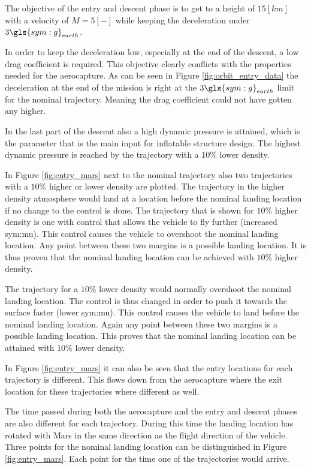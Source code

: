 The objective of the entry and descent phase is to get to a height of $15 \left[km\right]$ with a velocity of $M = 5\left[-\right]$ while keeping the deceleration under $3 \gls{sym:g}_{earth}$.

In order to keep the deceleration low, especially at the end of the descent, a low drag coefficient is required. This objective clearly conflicts with the properties needed for the aerocapture. As can be seen in Figure \ref{fig:orbit_entry_data} the deceleration at the end of the mission is right at the $3 \gls{sym:g}_{earth}$ limit for the nominal trajectory. Meaning the drag coefficient could not have gotten any higher.

In the last part of the descent also a high dynamic pressure is attained, which is the parameter that is the main input for inflatable structure design. The highest dynamic pressure is reached by the trajectory with a $10\%$ lower density.

In Figure \ref{fig:entry_mars} next to the nominal trajectory also two trajectories with a $10\%$ higher or lower density are plotted. The trajectory in the higher density atmosphere would land at a location before the nominal landing location if no change to the control is done. The trajectory that is shown for $10\%$ higher density is one with control that allows the vehicle to fly further (increased \gls{sym:mu}). This control causes the vehicle to overshoot the nominal landing location. Any point between these two margins is a possible landing location. It is thus proven that the nominal landing location can be achieved with $10\%$ higher density.

The trajectory for a $10\%$ lower density would normally overshoot the nominal landing location. The control is thus changed in order to push it towards the surface faster (lower \gls{sym:mu}). This control causes the vehicle to land before the nominal landing location. Again any point between these two margins is a possible landing location. This proves that the nominal landing location can be attained with $10\%$ lower density.

In Figure \ref{fig:entry_mars} it can also be seen that the entry locations for each trajectory is different. This flows down from the aerocapture where the exit location for these trajectories where different as well.

The time passed during both the aerocapture and the entry and descent phases are also different for each trajectory. During this time the landing location has rotated with Mars in the same direction as the flight direction of the vehicle. Three points for the nominal landing location can be distinguished in Figure \ref{fig:entry_mars}. Each point for the time one of the trajectories would arrive.

